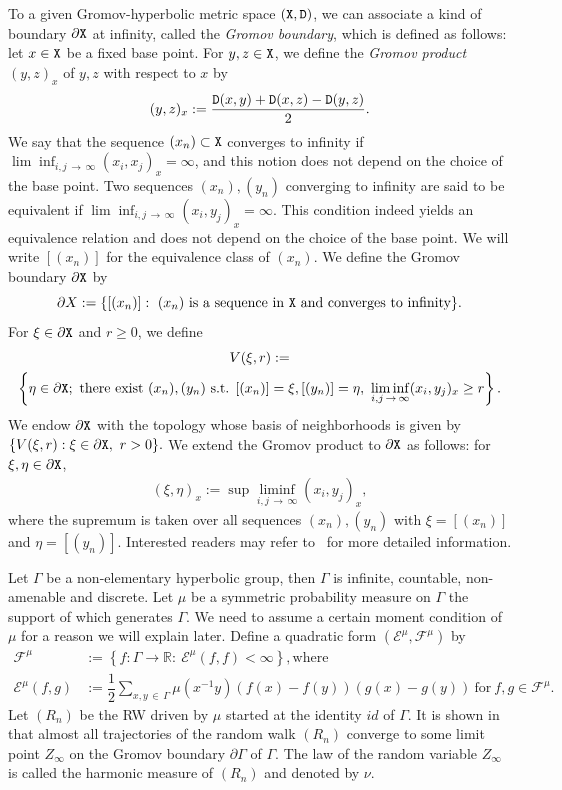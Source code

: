 \documentclass[10pt]{amsart}
\theoremstyle{definition}\newtheorem{defi}[theo]{Definition}\newtheorem{rema}[theo]{Remark}\newtheorem{exam}[theo]{Example}\newtheorem{exem}[theo]{Example}\newtheorem{nota}[theo]{Notation}
\newcommand{\ce}{\mathcal{E}}
\newcommand{\cf}{\mathcal{F}}
\newcommand{\br}{\mathbb{R}}
\begin{document}
To a given Gromov-hyperbolic metric space $(\tt{X}, \tt{D})$, we can associate a kind of boundary $\partial {\tt X}$ at infinity, called the \emph{Gromov boundary}, which is defined as follows: let $x\in\tt{X}$ be a fixed base point. For $y,z\in\tt{X}$, we define the \emph{Gromov product} $(y,z)_x$ of $y,z$ with respect to $x$ by
\begin{align}\label{def:product}
(y,z)_x:=\dfrac{{\tt D}(x,y)+{\tt D}(x,z)-{\tt D}(y,z)}{2}.
\end{align}
We say that the sequence $(x_n)\subset {\tt X}$ converges to infinity if $\lim\inf_{i,j\,\to\,\infty}(x_i,x_j)_x=\infty$, and this notion does not depend on the choice of the base point. Two sequences $(x_n), (y_n)$ converging to infinity are said to be equivalent if $\lim\inf_{i,j\,\to\,\infty}(x_i,y_j)_x=\infty$. This condition indeed yields an equivalence relation and does not depend on the choice of the base point. We will write $[(x_n)]$ for the equivalence class of $(x_n)$. We define the Gromov boundary $\partial{\tt X}$ by
\[
\partial X:=\{[(x_n)]:\ (x_n)\ \text{is a sequence in } {\tt X} \text{ and converges to infinity}\}.
\]
For $\xi\in\partial{\tt X}$ and $r\geq0$, we define
\begin{multline*}
V(\xi,r):=\\
\left\{\eta\in\partial{\tt X};\ \text{there exist }(x_n),(y_n)\text{ s.t. }[(x_n)]=\xi,[(y_n)]=\eta,\ \liminf_{i,j\,\to\,\infty}(x_i,y_j)_x\geq r\right\}.
\end{multline*}
We endow $\partial {\tt X}$ with the topology whose basis of neighborhoods is given by $\{V(\xi,r): \xi\in\partial{\tt X},\ r>0\}.$ We extend the Gromov product to $\partial {\tt X}$ as follows: for $\xi,\eta\in\partial{\tt X}$,
\begin{align}\label{def:product-boundary}
(\xi,\eta)_x:=\sup\liminf_{i,j\,\to\,\infty}(x_i,y_j)_x,
\end{align}
where the supremum is taken over all sequences $(x_n),(y_n)$ with $\xi=[(x_n)]$ and $\eta=[(y_n)]$. Interested readers may refer to~\cite{GH} for more detailed information.


Let $\Gamma$ be a non-elementary hyperbolic group, then $\Gamma$ is infinite, countable, non-amenable and discrete. Let $\mu$ be a symmetric probability measure on $\Gamma$ the support of which generates $\Gamma$. We need to assume a certain moment condition of $\mu$ for a reason we will explain later. Define a quadratic form $(\ce^{\mu},\cf^{\mu})$ by
\begin{align*}
\cf^{\mu}&:=\left\{f:\Gamma\to\br:\ \ce^{\mu}(f,f)<\infty\right\}, \text{where}\\
\ce^{\mu}(f,g)&:=\dfrac{1}{2}\sum_{x,y\,\in\,\Gamma}\mu\left(x^{-1}y\right)(f(x)-f(y))(g(x)-g(y))\ \text{for}\ f,g\in\cf^{\mu}.
\end{align*}
Let $(R_n)$ be the RW driven by $\mu$ started at the identity ${id}$ of $\Gamma$. It is shown in~\cite{Ka} that almost all trajectories of the random walk $(R_n)$ converge to some limit point $Z_\infty$ on the Gromov boundary $\partial\Gamma$ of $\Gamma$. The law of the random variable $Z_\infty$ is called the harmonic measure of $(R_n)$ and denoted by $\nu$.
\end{document}
